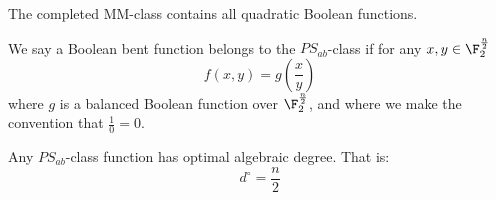 \begin{theorem}\label{1.2.9}
  The completed MM-class contains all quadratic Boolean functions.
\end{theorem}

\begin{definition}
  We say a Boolean bent function belongs to the $PS_{ab}$-class if for any $x,y
  \in \F_2^{\frac{n}{2}}$
  \begin{equation}\label{equation_1.22}
    f(x,y)=g(\frac{x}{y})
  \end{equation}
  where $g$ is a balanced Boolean function over  $\F_2^{\frac{n}{2}}$, and where
  we make the convention that $\frac{1}{0}=0$.
\end{definition}

\begin{lemma}\label{lemma_1.2.10}
  Any $PS_{ab}$-class function has optimal algebraic degree. That is:
  \begin{equation*}
    d^\circ=\frac{n}{2}
  \end{equation*}
\end{lemma}
